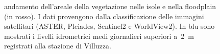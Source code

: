 \begin{figure}[ht]
	\centering
	
	\caption[andamento dell'areale della vegetazione nelle isole  e nella floodplain]{andamento dell'areale della vegetazione nelle isole e nella floodplain (in rosso). I dati provengono dalla classificazione delle immagini satellitari (ASTER, Pleiades, Sentinel2 e WorldView2). In blu sono mostrati i livelli idrometrici medi giornalieri superiori a~\SI{2}{\m} registrati alla stazione di Villuzza.}
	\label{graph:class-sat-veg}
\end{figure}











